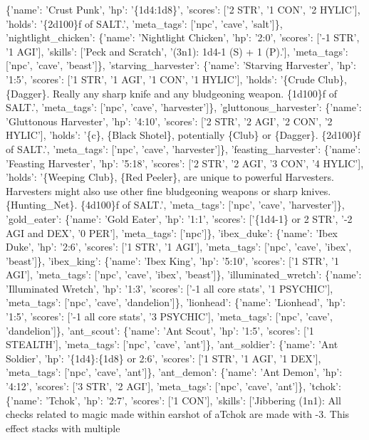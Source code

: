 \documentclass[
  letterpaper,
  DIV=11,
  numbers=noendperiod]{scrartcl}
\begin{document}
{\{'name': 'Crust Punk', 'hp': '\{1d4:1d8\}', 'scores': {[}'2 STR', '1
CON', '2 HYLIC'{]}, 'holds': '\{2d100\}f of SALT.', 'meta\_tags':
{[}'npc', 'cave', 'salt'{]}\}, 'nightlight\_chicken': \{'name':
'Nightlight Chicken', 'hp': '2:0', 'scores': {[}'-1 STR', '1 AGI'{]},
'skills': {[}'Peck and Scratch', '(3n1): 1d4-1 (S) + 1 (P).'{]},
'meta\_tags': {[}'npc', 'cave', 'beast'{]}\}, 'starving\_harvester':
\{'name': 'Starving Harvester', 'hp': '1:5', 'scores': {[}'1 STR', '1
AGI', '1 CON', '1 HYLIC'{]}, 'holds': '\{Crude Club\}, \{Dagger\}.
Really any sharp knife and any bludgeoning weapon. \{1d100\}f of SALT.',
'meta\_tags': {[}'npc', 'cave', 'harvester'{]}\},
'gluttonous\_harvester': \{'name': 'Gluttonous Harvester', 'hp': '4:10',
'scores': {[}'2 STR', '2 AGI', '2 CON', '2 HYLIC'{]}, 'holds': '\{c\},
\{Black Shotel\}, potentially \{Club\} or \{Dagger\}. \{2d100\}f of
SALT.', 'meta\_tags': {[}'npc', 'cave', 'harvester'{]}\},
'feasting\_harvester': \{'name': 'Feasting Harvester', 'hp': '5:18',
'scores': {[}'2 STR', '2 AGI', '3 CON', '4 HYLIC'{]}, 'holds':
'\{Weeping Club\}, \{Red Peeler\}, are unique to powerful Harvesters.
Harvesters might also use other fine bludgeoning weapons or sharp
knives. \{Hunting\_Net\}. \{4d100\}f of SALT.', 'meta\_tags': {[}'npc',
'cave', 'harvester'{]}\}, 'gold\_eater': \{'name': 'Gold Eater', 'hp':
'1:1', 'scores': {[}'\{1d4-1\} or 2 STR', '-2 AGI and DEX', '0 PER'{]},
'meta\_tags': {[}'npc'{]}\}, 'ibex\_duke': \{'name': 'Ibex Duke', 'hp':
'2:6', 'scores': {[}'1 STR', '1 AGI'{]}, 'meta\_tags': {[}'npc', 'cave',
'ibex', 'beast'{]}\}, 'ibex\_king': \{'name': 'Ibex King', 'hp': '5:10',
'scores': {[}'1 STR', '1 AGI'{]}, 'meta\_tags': {[}'npc', 'cave',
'ibex', 'beast'{]}\}, 'illuminated\_wretch': \{'name': 'Illuminated
Wretch', 'hp': '1:3', 'scores': {[}'-1 all core stats', '1 PSYCHIC'{]},
'meta\_tags': {[}'npc', 'cave', 'dandelion'{]}\}, 'lionhead': \{'name':
'Lionhead', 'hp': '1:5', 'scores': {[}'-1 all core stats', '3
PSYCHIC'{]}, 'meta\_tags': {[}'npc', 'cave', 'dandelion'{]}\},
'ant\_scout': \{'name': 'Ant Scout', 'hp': '1:5', 'scores': {[}'1
STEALTH'{]}, 'meta\_tags': {[}'npc', 'cave', 'ant'{]}\}, 'ant\_soldier':
\{'name': 'Ant Soldier', 'hp': '\{1d4\}:\{1d8\} or 2:6', 'scores': {[}'1
STR', '1 AGI', '1 DEX'{]}, 'meta\_tags': {[}'npc', 'cave', 'ant'{]}\},
'ant\_demon': \{'name': 'Ant Demon', 'hp': '4:12', 'scores': {[}'3 STR',
'2 AGI'{]}, 'meta\_tags': {[}'npc', 'cave', 'ant'{]}\}, 'tchok':
\{'name': 'Tchok', 'hp': '2:7', 'scores': {[}'1 CON'{]}, 'skills':
{[}'Jibbering (1n1): All checks related to magic made within earshot of
a\njibbering Tchok are made with -3. This effect stacks with multiple
}
\end{document}
